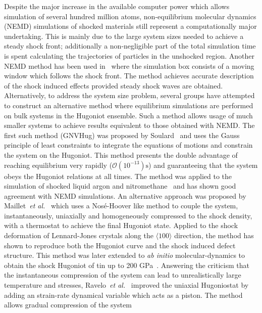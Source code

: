 \documentclass[aps,10pt,twocolumn]{revtex4}
\makeatletter
\newcommand{\etal}{\emph{et al.}\@\xspace}
\newcommand{\mrm}[1]{\ensuremath{\mathrm{#1}}\xspace}
\makeatother
\begin{document}
Despite the major increase in the available computer power which allows simulation of several
hundred million atoms, non-equilibrium molecular dynamics (NEMD) simulations of shocked materials
still represent a computationally major undertaking. This is mainly due to the large system
sizes needed to achieve a steady shock front; additionally a non-negligible part of the total
simulation time is spent calculating the trajectories of particles in the unshocked region. 
Another NEMD method has been used in~\cite{ZhakhovskiiZybin99} where the simulation box
consists of a moving window which follows the shock front. The method achieves accurate description
of the shock induced effects provided steady shock waves are obtained.
Alternatively, to address the system size problem, several groups have attempted to construct an
alternative method where equilibrium simulations are performed on bulk systems in the Hugoniot
ensemble. Such a method 
allows usage of much smaller systems to achieve results equivalent to those obtained with NEMD.
The first such method (GNVHug) was proposed by Soulard~\cite{Soulard99} and uses the Gauss
principle of least constraints to integrate the equations of motions and constrain the system on
the Hugoniot. This method presents the double advantage of reaching equilibrium very rapidly
($\mathcal{O}(10^{-13})\mrm{s}$) and guaranteeing that the system obeys the Hugoniot relations
at all times. The method was applied to the simulation of shocked liquid argon and
nitromethane~\cite{Soulard99,Soulard01} and has shown good agreement with NEMD simulations. An
alternative approach was proposed by Maillet~\etal~\cite{MailletMareschal00} which uses a
Nos\'e-Hoover like method to couple the system, instantaneously, uniaxially and homogeneously
compressed to the shock density, with a thermostat to achieve the final Hugoniot state. Applied
to the shock deformation of Lennard-Jones crystals along the $\langle 100 \rangle$ direction,
the method has shown to reproduce both the 
Hugoniot curve and the shock induced defect structure. This method was later extended to
\textit{ab initio} molecular-dynamics to obtain the shock Hugoniot of tin up to 200
GPa~\cite{BernardMaillet02}. Answering the criticism that the instantaneous compression of the 
system can lead to unrealistically large temperature and stresses,
Ravelo~\etal~\cite{RaveloHolian04} improved the uniaxial Hugoniostat by adding an strain-rate
dynamical variable which acts as a piston. The method allows gradual compression of the system
\end{document}

